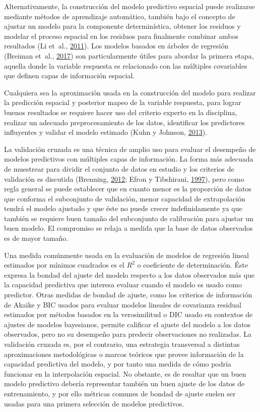 \documentclass[11pt,b5paper,]{krantz}
\begin{document}
Alternativamente, la construcción del modelo predictivo espacial puede
realizarse mediante métodos de aprendizaje automático, también bajo el
concepto de ajustar un modelo para la componente determinística, obtener
los residuos y modelar el proceso espacial en los residuos para
finalmente combinar ambos resultados (Li et~al.,
\protect\hyperlink{ref-Li_Heap_Potter_Daniell_2011}{2011}). Los modelos
basados en árboles de regresión (Breiman et~al.,
\protect\hyperlink{ref-Breiman_Friedman_Olshen_Stone_2017}{2017}) son
particularmente útiles para abordar la primera etapa, aquella donde la
variable respuesta es relacionado con las múltiples covariables que
definen capas de información espacial.

Cualquiera sea la aproximación usada en la construcción del modelo para
realizar la predicción espacial y posterior mapeo de la variable
respuesta, para lograr buenos resultados se requiere hacer uso del
criterio experto en la disciplina, realizar un adecuado preprocesamiento
de los datos, identificar los predictores influyentes y validar el
modelo estimado (Kuhn y Johnson,
\protect\hyperlink{ref-Kuhn_Johnson_2013}{2013}).

La validación cruzada es una técnica de amplio uso para evaluar el
desempeño de modelos predictivos con múltiples capas de información. La
forma más adecuada de muestrear para dividir el conjunto de datos en
estudio y los criterios de validación es discutida (Brenning,
\protect\hyperlink{ref-Brenning_2012}{2012}; Efron y Tibshirani,
\protect\hyperlink{ref-Efron_Tibshirani_1997}{1997}), pero como regla
general se puede establecer que en cuanto menor es la proporción de
datos que conforma el subconjunto de validación, menor capacidad de
extrapolación tendrá el modelo ajustado y que éste no puede crecer
indefinidamente ya que también se requiere buen tamaño del subconjunto
de calibración para ajustar un buen modelo. El compromiso se relaja a
medida que la base de datos observados es de mayor tamaño.

Una medida comúnmente usada en la evaluación de modelos de regresión
lineal estimados por mínimos cuadrados es el \(R^2\) o coeficiente de
determinación. Éste expresa la bondad del ajuste del modelo respecto a
los datos observados más que la capacidad predictiva que interesa
evaluar cuando el modelo es usado como predictor. Otras medidas de
bondad de ajuste, como los criterios de información de Akaike y BIC
usados para evaluar modelos lineales de covarianza residual estimados
por métodos basados en la verosimilitud o DIC usado en contextos de
ajustes de modelos bayesianos, permite calificar el ajuste del modelo a
los datos observados, pero no su desempeño para predecir observaciones
no realizadas. La validación cruzada es, por el contrario, una
estrategia transversal a distintas aproximaciones metodológicas o marcos
teóricos que provee información de la capacidad predictiva del modelo, y
por tanto una medida de cómo podría funcionar en la interpolación
espacial. No obstante, es de resaltar que un buen modelo predictivo
debería representar también un buen ajuste de los datos de
entrenamiento, y por ello métricas comunes de bondad de ajuste suelen
ser usadas para una primera selección de modelos predictivos.
\end{document}
